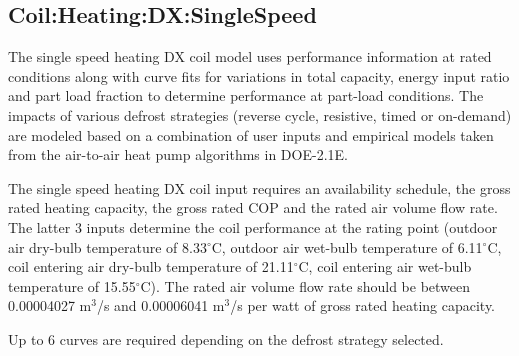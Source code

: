 \subsection{Coil:Heating:DX:SingleSpeed}\label{coilheatingdxsinglespeed}

The single speed heating DX coil model uses performance information at rated conditions along with curve fits for variations in total capacity, energy input ratio and part load fraction to determine performance at part-load conditions. The impacts of various defrost strategies (reverse cycle, resistive, timed or on-demand) are modeled based on a combination of user inputs and empirical models taken from the air-to-air heat pump algorithms in DOE-2.1E.

The single speed heating DX coil input requires an availability schedule, the gross rated heating capacity, the gross rated COP and the rated air volume flow rate. The latter 3 inputs determine the coil performance at the rating point (outdoor air dry-bulb temperature of 8.33$^\circ$C, outdoor air wet-bulb temperature of 6.11$^\circ$C, coil entering air dry-bulb temperature of 21.11$^\circ$C, coil entering air wet-bulb temperature of 15.55$^\circ$C). The rated air volume flow rate should be between 0.00004027 m\(^{3}\)/s and 0.00006041 m\(^{3}\)/s per watt of gross rated heating capacity.

Up to 6 curves are required depending on the defrost strategy selected.

